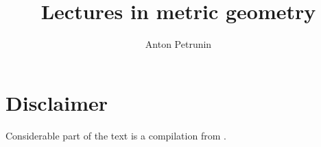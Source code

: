 \documentclass[twoside]{book}
\begin{document}
 
\title{Lectures in metric geometry}
\author{Anton Petrunin}
\date{}
\maketitle



\section*{Disclaimer}

Considerable part of the text is a compilation from \cite{alexander-kapovitch-petrunin-2019, alexander-kapovitch-petrunin-2025, petrunin-yashinski, petrunin-zamorabarrera}.

\thispagestyle{empty}
\tableofcontents
\thispagestyle{empty}




{
\printbibliography[heading=bibintoc]
\fussy
}
\end{document}
